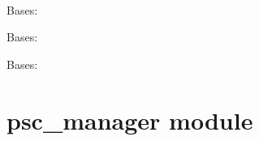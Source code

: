 \documentclass[letterpaper,10pt,oneside]{sphinxmanual}
\begin{document}
\begin{fulllineitems}
\label{pscExceptions:pscExceptions.pscExceptions}~

\begin{fulllineitems}
\label{pscExceptions:pscExceptions.pscExceptions.PSAconfNotFound}
Bases: 

\end{fulllineitems}


\begin{fulllineitems}
\label{pscExceptions:pscExceptions.pscExceptions.TVDnotInstantiated}
Bases: 

\end{fulllineitems}


\begin{fulllineitems}
\label{pscExceptions:pscExceptions.pscExceptions.pscWrongProfileType}
Bases: 

\end{fulllineitems}


\end{fulllineitems}



\chapter{psc\_manager module}
\label{psc_manager:module-psc_manager}\label{psc_manager::doc}\label{psc_manager:psc-manager-module}
\end{document}
